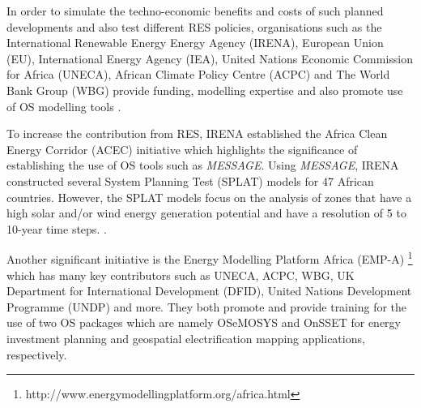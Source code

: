 \documentclass[conference, a4paper]{IEEEtran}
\begin{document}

In order to simulate the techno-economic benefits and costs of such planned developments and also test different RES policies, organisations such as the International Renewable Energy Energy Agency (IRENA),
European Union (EU), International Energy Agency (IEA), United Nations Economic Commission for Africa (UNECA), African Climate Policy Centre (ACPC) and The World Bank Group (WBG) provide funding, modelling expertise and also promote use of OS modelling tools \cite{}.%

To increase the contribution from RES, IRENA established the Africa Clean Energy Corridor (ACEC) initiative which highlights the significance of establishing the use of OS tools such as \emph{MESSAGE}. Using \emph{MESSAGE}, IRENA constructed several System Planning Test (SPLAT) models for 47 African countries. However, the SPLAT models focus on the analysis of zones that have a high solar and/or wind energy generation potential and have a resolution of 5 to 10-year time steps.
. %



Another significant initiative is the Energy Modelling Platform Africa (EMP-A) \footnote{http://www.energymodellingplatform.org/africa.html} which has many key contributors such as UNECA, ACPC, WBG, UK Department for International Development (DFID), United Nations Development Programme (UNDP) and more. They both promote and provide training for the use of two OS packages which are namely OSeMOSYS and OnSSET for energy investment planning and geospatial electrification mapping applications, respectively.
\end{document}
